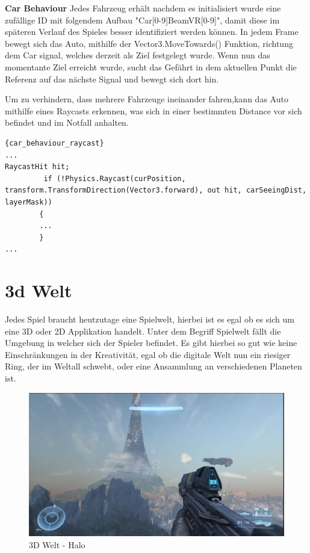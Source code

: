 \textbf{Car Behaviour}
Jedes Fahrzeug erh\"alt nachdem es initialisiert wurde eine zufällige ID mit folgendem Aufbau "Car[0-9]BeamVR[0-9]", damit diese im sp\"ateren Verlauf des Spieles besser identifiziert werden können.
In jedem Frame bewegt sich das Auto, mithilfe der Vector3.MoveTowards() Funktion, richtung dem Car signal, welches derzeit als Ziel festgelegt wurde.
Wenn nun das momentante Ziel erreicht wurde, sucht das Gefährt in dem aktuellen Punkt die Referenz auf das nächste Signal und bewegt sich dort hin.

Um zu verhindern, dass mehrere Fahrzeuge ineinander fahren,kann das Auto mithilfe eines Raycasts erkennen, was sich in einer bestimmten Distance vor sich befindet und im Notfall anhalten.

\begin{lstlisting}{car_behaviour_raycast}
...
RaycastHit hit;
         if (!Physics.Raycast(curPosition, transform.TransformDirection(Vector3.forward), out hit, carSeeingDist, layerMask))
        {
        ...
        }
...
\end{lstlisting}

\section{3d Welt}\label{sec:3d-world}
Jedes Spiel braucht heutzutage eine Spielwelt, hierbei ist es egal ob es sich um eine 3D oder 2D Applikation handelt.
Unter dem Begriff Spielwelt fällt die Umgebung in welcher sich der Spieler befindet.
Es gibt hierbei so gut wie keine Einschränkungen in der Kreativität, egal ob die digitale Welt nun ein riesiger Ring, der im Weltall schwebt,
oder eine Ansammlung an verschiedenen Planeten ist.
~\cite{GamesRadar_HaloRing_2022}



\begin{figure}
    \centering
    \includegraphics[scale=0.4]{pics/3d_welt_halo_ring}
    \caption{3D Welt - Halo}
    \label{fig:3d_environment_halo}
\end{figure}


